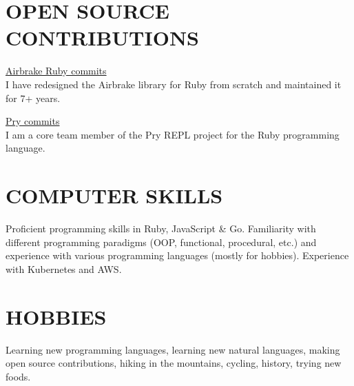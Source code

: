 \documentclass{res}
\begin{document}
\begin{resume}
  \section{OPEN SOURCE CONTRIBUTIONS}

  \href{https://github.com/airbrake/airbrake-ruby/commits?author=kyrylo}{Airbrake
    Ruby commits}
  \\
  I have redesigned the Airbrake library for Ruby from scratch and maintained
  it for 7+ years.

  \href{https://github.com/pry/pry/commits?author=kyrylo}{Pry commits}
  \\
  I am a core team member of the Pry REPL project for the Ruby
  programming language.

  \section{COMPUTER SKILLS}

  Proficient programming skills in Ruby, JavaScript \& Go. Familiarity with
  different programming paradigms (OOP, functional, procedural, etc.) and
  experience with various programming languages (mostly for hobbies). Experience
  with Kubernetes and AWS.

  \section{HOBBIES}

  Learning new programming languages, learning new natural languages, making
  open source contributions, hiking in the mountains, cycling, history,
  trying new foods.

\end{resume}
\end{document}
